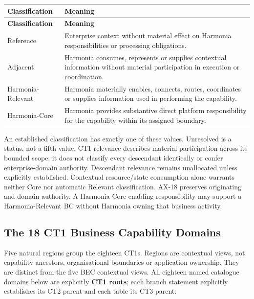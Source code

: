 \label{rad:business:99}
\begingroup\small\setlength{\TableWidth}{\dimexpr\linewidth-4\tabcolsep-3\arrayrulewidth\relax}
\begin{longtable}{|>{\raggedright\arraybackslash}p{0.35\TableWidth}|>{\raggedright\arraybackslash}p{0.65\TableWidth}|}
\hline\rowcolor{TableHead}\textbf{Classification} & \textbf{Meaning}\\\hline\endfirsthead
\hline\rowcolor{TableHead}\textbf{Classification} & \textbf{Meaning}\\\hline\endhead
\hline\endfoot
Reference & Enterprise context without material effect on Harmonia responsibilities or processing obligations.\\\hline
Adjacent & Harmonia consumes, represents or supplies contextual information without material participation in execution or coordination.\\\hline
Harmonia-Relevant & Harmonia materially enables, connects, routes, coordinates or supplies information used in performing the capability.\\\hline
Harmonia-Core & Harmonia provides substantive direct platform responsibility for the capability within its assigned boundary.\\\hline
\end{longtable}\endgroup
{}\label{rad:business:106}

An established classification has exactly one of these values. Unresolved is a status, not a fifth value. CT1 relevance describes material participation across its bounded scope; it does not classify every descendant identically or confer enterprise-domain authority. Descendant relevance remains unallocated unless explicitly established. Contextual resource/\allowbreak{}state consumption alone warrants neither Core nor automatic Relevant classification. AX-18 preserves originating and domain authority. A Harmonia-Core enabling responsibility may support a Harmonia-Relevant BC without Harmonia owning that business activity.

\label{rad:business:115}
\subsection*{The 18 CT1 Business Capability Domains}
\label{rad:business:117}

Five natural regions group the eighteen CT1s. Regions are contextual views, not capability ancestors, organisational boundaries or application ownership. They are distinct from the five BEC contextual views. All eighteen named catalogue domains below are explicitly \textbf{CT1 roots}; each branch statement explicitly establishes its CT2 parent and each table its CT3 parent.

